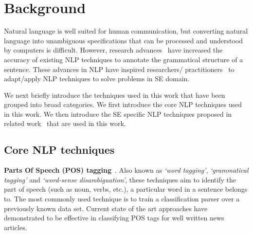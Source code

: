 \section{Background}
\label{sec:background}

Natural language is well suited for human communication, but converting natural language into unambiguous specifications that can be processed and understood by computers is difficult.
However, research advances~\cite{Marneffe06LREC,Marneffe08COLING,Klein03,KleinNIPS03} have increased the accuracy of existing NLP techniques to annotate the grammatical structure of a sentence.
These advances in NLP have inspired researchers/ practitioners~\cite{pandita12:inferring, pandita13:WHYPER, johnSlankasPASSAT13, XiaoFSE2012, thummalapentaICSE12} to adapt/apply NLP techniques to solve problems in SE domain.

We next briefly introduce the techniques used in this work that have been grouped into broad categories.
We first introduce the core NLP techniques used in this work.
We then introduce the SE specific NLP techniques proposed in related work~\cite{pandita12:inferring,pandita13:WHYPER} that are used in this work.

\subsection{Core NLP techniques}
\label{sub:CoreNLPback}



\textbf{Parts Of Speech (POS) tagging}~\cite{Klein03,KleinNIPS03}. Also known as \textit{`word tagging'}, \textit{`grammatical tagging'} and \textit{`word-sense disambiguation'}, these techniques aim to identify the part of speech (such as noun, verbs, etc.), a particular word in a sentence belongs to. The most commonly used technique is to train a classification parser over a previously known data set. Current state of the art approaches have demonstrated to be effective in classifying POS tags for well written news articles.

